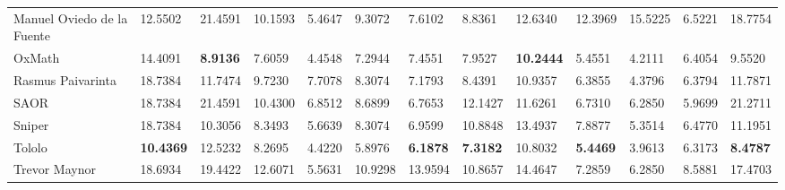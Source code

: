 \begin{table}[!ht]
\begin{adjustbox}{width=\textwidth}
\begin{tabular}{lllllllllllll}
  Manuel Oviedo de la Fuente & 12.5502                         & 21.4591                         & 10.1593                         & 5.4647                         & 9.3072                         & 7.6102  & 8.8361                          & 12.6340 & 12.3969 & 15.5225                        & 6.5221                         & 18.7754                         \\
  OxMath                     & 14.4091 & \textbf{8.9136}                          & 7.6059                          & 4.4548                         & 7.2944                         & 7.4551  & 7.9527                          & \textbf{10.2444} & 5.4551  & 4.2111                         & 6.4054                         & 9.5520                          \\
  Rasmus Paivarinta          & 18.7384 & 11.7474                         & 9.7230                          & 7.7078                         & 8.3074 & 7.1793  & 8.4391                          & 10.9357 & 6.3855  & 4.3796                         & 6.3794                         & 11.7871                         \\
  SAOR                       & 18.7384 & 21.4591 & 10.4300 & 6.8512                         & 8.6899                         & 6.7653  & 12.1427                         & 11.6261 & 6.7310  & 6.2850 & 5.9699                         & 21.2711                         \\
  Sniper                     & 18.7384 & 10.3056                         & 8.3493                          & 5.6639                         & 8.3074                         & 6.9599  & 10.8848                         & 13.4937 & 7.8877  & 5.3514                         & 6.4770                         & 11.1951                         \\
  Tololo                     & \textbf{10.4369}                         & 12.5232                         & 8.2695                          & 4.4220                         & 5.8976                         & \textbf{6.1878}  & \textbf{7.3182}                          & 10.8032 & \textbf{5.4469}  & 3.9613                         & 6.3173                         & \textbf{8.4787}                          \\
  Trevor Maynor              & 18.6934                         & 19.4422                         & 12.6071                         & 5.5631                         & 10.9298                        & 13.9594 & 10.8657                         & 14.4647 & 7.2859  & 6.2850                         & 8.5881                         & 17.4703                         \\

\end{tabular}
\end{adjustbox}
\end{table}
